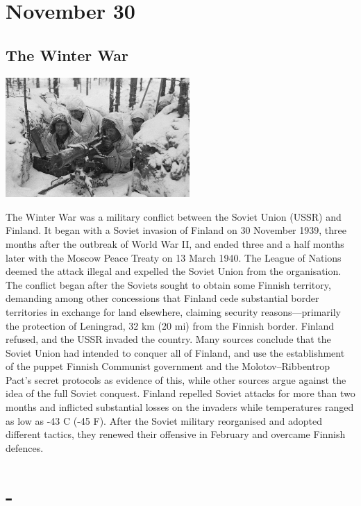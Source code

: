 \documentclass[11pt]{report}
\begin{document}
\section{November 30}
\subsection{The Winter War}
\vspace{2mm}\begin{center}\includegraphics[width=7cm]{./img/winterWar.jpg}\end{center}
The Winter War was a military conflict between the Soviet Union (USSR) and Finland. It began with a Soviet invasion of Finland on 30 November 1939, three months after the outbreak of World War II, and ended three and a half months later with the Moscow Peace Treaty on 13 March 1940. The League of Nations deemed the attack illegal and expelled the Soviet Union from the organisation.\\
\indent The conflict began after the Soviets sought to obtain some Finnish territory, demanding among other concessions that Finland cede substantial border territories in exchange for land elsewhere, claiming security reasons—primarily the protection of Leningrad, 32 km (20 mi) from the Finnish border. Finland refused, and the USSR invaded the country. Many sources conclude that the Soviet Union had intended to conquer all of Finland, and use the establishment of the puppet Finnish Communist government and the Molotov–Ribbentrop Pact's secret protocols as evidence of this, while other sources argue against the idea of the full Soviet conquest. Finland repelled Soviet attacks for more than two months and inflicted substantial losses on the invaders while temperatures ranged as low as -43 C (-45 F). After the Soviet military reorganised and adopted different tactics, they renewed their offensive in February and overcame Finnish defences.
\section{-}
\end{document}
